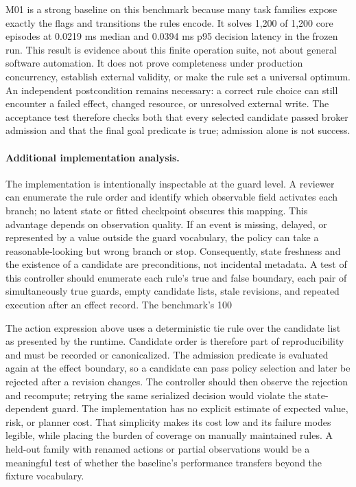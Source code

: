 M01 is a strong baseline on this benchmark because many task families expose exactly the flags and transitions the rules encode. It solves 1,200 of 1,200 core episodes at 0.0219 ms median and 0.0394 ms p95 decision latency in the frozen run. This result is evidence about this finite operation suite, not about general software automation. It does not prove completeness under production concurrency, establish external validity, or make the rule set a universal optimum. An independent postcondition remains necessary: a correct rule choice can still encounter a failed effect, changed resource, or unresolved external write. The acceptance test therefore checks both that every selected candidate passed broker admission and that the final goal predicate is true; admission alone is not success.



\paragraph{Additional implementation analysis.} The implementation is intentionally inspectable at the guard level. A reviewer can enumerate the rule order and identify which observable field activates each branch; no latent state or fitted checkpoint obscures this mapping. This advantage depends on observation quality. If an event is missing, delayed, or represented by a value outside the guard vocabulary, the policy can take a reasonable-looking but wrong branch or stop. Consequently, state freshness and the existence of a candidate are preconditions, not incidental metadata. A test of this controller should enumerate each rule's true and false boundary, each pair of simultaneously true guards, empty candidate lists, stale revisions, and repeated execution after an effect record. The benchmark's 100%

The action expression above uses a deterministic tie rule over the candidate list as presented by the runtime. Candidate order is therefore part of reproducibility and must be recorded or canonicalized. The admission predicate is evaluated again at the effect boundary, so a candidate can pass policy selection and later be rejected after a revision changes. The controller should then observe the rejection and recompute; retrying the same serialized decision would violate the state-dependent guard. The implementation has no explicit estimate of expected value, risk, or planner cost. That simplicity makes its cost low and its failure modes legible, while placing the burden of coverage on manually maintained rules. A held-out family with renamed actions or partial observations would be a meaningful test of whether the baseline's performance transfers beyond the fixture vocabulary.

